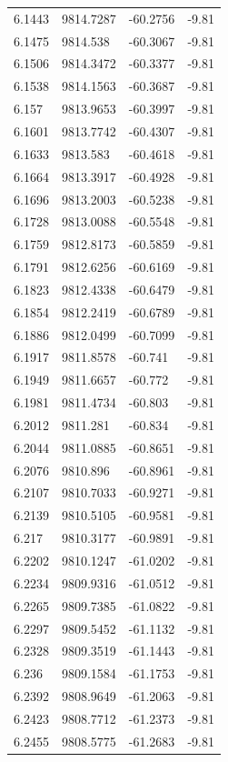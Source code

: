 \begin{table}[H]
\begin{tabular}{llll}
6.1443 & 9814.7287 & -60.2756 & -9.81 \\
6.1475 & 9814.538 & -60.3067 & -9.81 \\
6.1506 & 9814.3472 & -60.3377 & -9.81 \\
6.1538 & 9814.1563 & -60.3687 & -9.81 \\
6.157 & 9813.9653 & -60.3997 & -9.81 \\
6.1601 & 9813.7742 & -60.4307 & -9.81 \\
6.1633 & 9813.583 & -60.4618 & -9.81 \\
6.1664 & 9813.3917 & -60.4928 & -9.81 \\
6.1696 & 9813.2003 & -60.5238 & -9.81 \\
6.1728 & 9813.0088 & -60.5548 & -9.81 \\
6.1759 & 9812.8173 & -60.5859 & -9.81 \\
6.1791 & 9812.6256 & -60.6169 & -9.81 \\
6.1823 & 9812.4338 & -60.6479 & -9.81 \\
6.1854 & 9812.2419 & -60.6789 & -9.81 \\
6.1886 & 9812.0499 & -60.7099 & -9.81 \\
6.1917 & 9811.8578 & -60.741 & -9.81 \\
6.1949 & 9811.6657 & -60.772 & -9.81 \\
6.1981 & 9811.4734 & -60.803 & -9.81 \\
6.2012 & 9811.281 & -60.834 & -9.81 \\
6.2044 & 9811.0885 & -60.8651 & -9.81 \\
6.2076 & 9810.896 & -60.8961 & -9.81 \\
6.2107 & 9810.7033 & -60.9271 & -9.81 \\
6.2139 & 9810.5105 & -60.9581 & -9.81 \\
6.217 & 9810.3177 & -60.9891 & -9.81 \\
6.2202 & 9810.1247 & -61.0202 & -9.81 \\
6.2234 & 9809.9316 & -61.0512 & -9.81 \\
6.2265 & 9809.7385 & -61.0822 & -9.81 \\
6.2297 & 9809.5452 & -61.1132 & -9.81 \\
6.2328 & 9809.3519 & -61.1443 & -9.81 \\
6.236 & 9809.1584 & -61.1753 & -9.81 \\
6.2392 & 9808.9649 & -61.2063 & -9.81 \\
6.2423 & 9808.7712 & -61.2373 & -9.81 \\
6.2455 & 9808.5775 & -61.2683 & -9.81 \\

\end{tabular}
\end{table}
